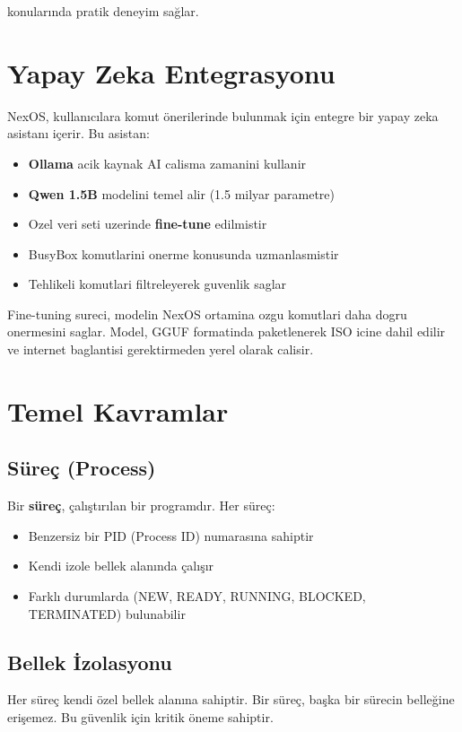 \documentclass[12pt,a4paper]{report}
\begin{document}
konularında pratik deneyim sağlar.

\section{Yapay Zeka Entegrasyonu}

NexOS, kullanıcılara komut önerilerinde bulunmak için entegre bir yapay zeka asistanı içerir. Bu asistan:

\begin{itemize}
    \item \textbf{Ollama} acik kaynak AI calisma zamanini kullanir
    \item \textbf{Qwen 1.5B} modelini temel alir (1.5 milyar parametre)
    \item Ozel veri seti uzerinde \textbf{fine-tune} edilmistir
    \item BusyBox komutlarini onerme konusunda uzmanlasmistir
    \item Tehlikeli komutlari filtreleyerek guvenlik saglar
\end{itemize}

Fine-tuning sureci, modelin NexOS ortamina ozgu komutlari daha dogru onermesini saglar. Model, GGUF formatinda paketlenerek ISO icine dahil edilir ve internet baglantisi gerektirmeden yerel olarak calisir.

\section{Temel Kavramlar}

\subsection{Süreç (Process)}

Bir \textbf{süreç}, çalıştırılan bir programdır. Her süreç:
\begin{itemize}
    \item Benzersiz bir PID (Process ID) numarasına sahiptir
    \item Kendi izole bellek alanında çalışır
    \item Farklı durumlarda (NEW, READY, RUNNING, BLOCKED, TERMINATED) bulunabilir
\end{itemize}

\subsection{Bellek İzolasyonu}

Her süreç kendi özel bellek alanına sahiptir. Bir süreç, başka bir sürecin belleğine erişemez. Bu güvenlik için kritik öneme sahiptir.
\end{document}
